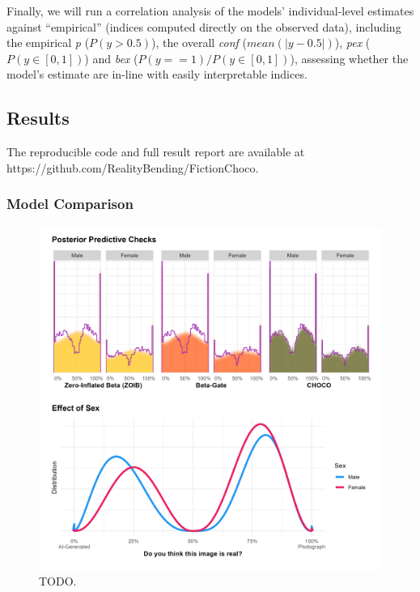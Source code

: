 \documentclass[
  jou,
  floatsintext,
  longtable,
  nolmodern,
  notxfonts,
  notimes,
  colorlinks=true,linkcolor=blue,citecolor=blue,urlcolor=blue]{apa7}
\begin{document}
Finally, we will run a correlation analysis of the models'
individual-level estimates against ``empirical'' (indices computed
directly on the observed data), including the empirical \emph{p}
(\(P(y > 0.5)\)), the overall \emph{conf} (\(mean(|y - 0.5|)\)),
\emph{pex} (\(P(y \in [0, 1])\)) and \emph{bex}
(\(P(y == 1) / P(y \in [0, 1])\)), assessing whether the model's
estimate are in-line with easily interpretable indices.

\subsection{Results}\label{results}

The reproducible code and full result report are available at
https://github.com/RealityBending/FictionChoco.

\subsubsection{Model Comparison}\label{model-comparison}

\begin{figure}[!htbp]

{\caption{{TODO.}{\label{fig-three}}}}

\includegraphics[width=1\textwidth,height=\textheight]{./figures/fig3.png}

\end{figure}
\end{document}
